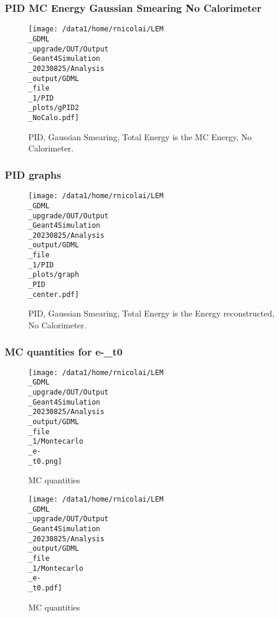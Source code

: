 \documentclass[8pt]{beamer}
\begin{document}
            \begin{frame}
                \frametitle{PID MC Energy Gaussian Smearing No Calorimeter}
            
        \begin{figure}[h]
            \centering
            \texttt{[image: /data1/home/rnicolai/LEM\\\_GDML\\\_upgrade/OUT/Output\\\_Geant4Simulation\\\_20230825/Analysis\\\_output/GDML\\\_file\\\_1/PID\\\_plots/gPID2\\\_NoCalo.pdf]}
            \caption{PID, Gaussian Smearing, Total Energy is the MC Energy, No Calorimeter.}
        \end{figure}
        
            \end{frame}
            
            \begin{frame}
                \frametitle{PID graphs}
            
        \begin{figure}[h]
            \centering
            \texttt{[image: /data1/home/rnicolai/LEM\\\_GDML\\\_upgrade/OUT/Output\\\_Geant4Simulation\\\_20230825/Analysis\\\_output/GDML\\\_file\\\_1/PID\\\_plots/graph\\\_PID\\\_center.pdf]}
            \caption{PID, Gaussian Smearing, Total Energy is the Energy reconstructed, No Calorimeter.}
        \end{figure}
        
            \end{frame}
            
            \begin{frame}
                \frametitle{MC quantities for e-\_t0}
            
        \begin{figure}[h]
            \centering
            \texttt{[image: /data1/home/rnicolai/LEM\\\_GDML\\\_upgrade/OUT/Output\\\_Geant4Simulation\\\_20230825/Analysis\\\_output/GDML\\\_file\\\_1/Montecarlo\\\_e-\\\_t0.png]}
            \caption{MC quantities}
        \end{figure}
        
        \begin{figure}[h]
            \centering
            \texttt{[image: /data1/home/rnicolai/LEM\\\_GDML\\\_upgrade/OUT/Output\\\_Geant4Simulation\\\_20230825/Analysis\\\_output/GDML\\\_file\\\_1/Montecarlo\\\_e-\\\_t0.pdf]}
            \caption{MC quantities}
        \end{figure}
        
            \end{frame}
            
\end{document}
